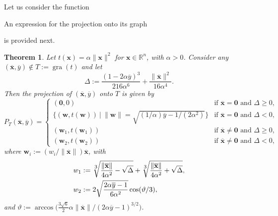 \documentclass[11pt]{article}
\newcommand{\menge}[2]{\big\{{#1}~\big |~{#2}\big\}}
\newcommand{\RR}{\ensuremath{\mathbb R}}
\newtheorem{theorem}{Theorem}[section]
\providecommand{\RR}{\mathbb{R}}
\providecommand{\gra}{\operatorname{gra}}
\providecommand{\RR}{\mathbb{R}}
\newcommand*\mybluebox[1]{%
    \colorbox{myblue}{\hspace{1em}#1\hspace{1em}}}
\newcommand{\px}{\overline{x}}
\newcommand{\py}{\overline{y}}
\begin{document}
Let us consider the function 
An expression for the projection onto its graph
is provided next.
\begin{theorem}
    Let $t(\mathbf{x})=\alpha \|\mathbf{x}\|^2$  for $\mathbf{x}\in\RR^n$, with $\alpha>0$. Consider any $(\mathbf{\px},\py)\notin T:=\gra(t)$ and let 
    $$\Delta := \frac{(1-2\alpha\py)^3}{216\alpha^6}+\frac{\|\mathbf{\px}\|^2}{16\alpha^4}.$$
    Then the projection of $(\mathbf{\px},\py)$ onto $T$ is given by
    \[P_T(\mathbf{\px},\py)=\begin{cases}
        (\mathbf{0},0) &\text{if }\mathbf{\px}=\mathbf{0}\text{ and } \Delta\geq 0,\\
        \menge{(\mathbf{w},t(\mathbf{w}))}{\|\mathbf{w}\|=\sqrt{(1/\alpha)\py-1/(2\alpha^2)}}&\text{if } \mathbf{\px}=\mathbf{0}\text{ and } \Delta< 0,\\
        (\mathbf{w}_1,t(\mathbf{w}_1)) & \text{if }\mathbf{\px}\neq \mathbf{0}\text{ and }\Delta\geq 0,\\
        (\mathbf{w}_2,t(\mathbf{w}_2)) &\text{if }\mathbf{\px}\neq \mathbf{0}\text{ and }\Delta<0,
    \end{cases}\]
    where $\mathbf{w}_i:=(w_i/\|\mathbf{\px}\|)\mathbf{\px}$, with
    \begin{align*}
        w_1&:=\sqrt[\mathlarger 3]{\frac{\|\mathbf{\px}\|}{4\alpha^2}-\sqrt{\Delta}}+\sqrt[\mathlarger 3]{\frac{\|\mathbf{\px}\|}{4\alpha^2}+ \sqrt{\Delta}},\\
        w_2&:=2\sqrt{\frac{2\alpha\py-1}{6\alpha^2}}\cos(\vartheta/3), 
    \end{align*}
and $\vartheta:=\arccos\big(\frac{3\sqrt{6}}{2}\alpha\|\mathbf{\px}\|/(2\alpha\py-1)^{3/2}\big)$.
\end{theorem}
\end{document}

